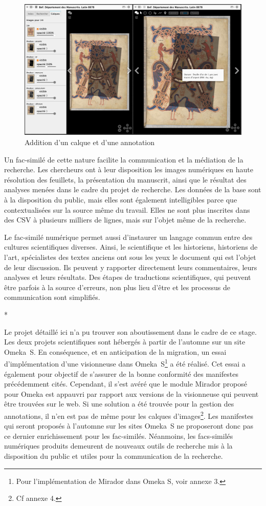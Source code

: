 \begin{figure}[H]
	\centering
	\includegraphics[width=\textwidth]{./textes/chap4/iiif-calque-annot.jpg}
	\caption{Addition d'un calque et d'une annotation}
	\label{fig:info}
\end{figure}
Un fac-similé de cette nature facilite la communication et la médiation de la recherche. Les chercheurs ont à leur disposition les images numériques en haute résolution des feuillets, la présentation du manuscrit, ainsi que le résultat des analyses menées dans le cadre du projet de recherche. Les données de la base sont à la disposition du public, mais elles sont également intelligibles parce que contextualisées sur la source même du travail. Elles ne sont plus inscrites dans des CSV à plusieurs milliers de lignes, mais sur l’objet même de la recherche. \par
Le fac-similé numérique permet aussi d’instaurer un langage commun entre des cultures scientifiques diverses. Ainsi, le scientifique et les historiens, historiens de l’art, spécialistes des textes anciens ont sous les yeux le document qui est l’objet de leur discussion. Ils peuvent y rapporter directement leurs commentaires, leurs analyses et leurs résultats. Des étapes de traductions scientifiques, qui peuvent être parfois à la source d’erreurs, non plus lieu d’être et les processus de communication sont simplifiés.\newpage

*\\\par
Le projet détaillé ici n’a pu trouver son aboutissement dans le cadre de ce stage. Les deux projets scientifiques sont hébergés à partir de l’automne sur un site Omeka~S. En conséquence, et en anticipation de la migration, un essai d’implémentation d’une visionneuse dans Omeka~S\footnote{Pour l’implémentation de Mirador dans Omeka S, voir annexe 3.} a été réalisé. Cet essai a également pour objectif de s’assurer de la bonne conformité des manifestes~ précédemment cités. Cependant, il s’est avéré que le module Mirador proposé pour Omeka est appauvri par rapport aux versions de la visionneuse qui peuvent être trouvées sur le web. Si une solution a été trouvée pour la gestion des annotations, il n’en est pas de même pour les calques d’images\footnote{Cf annexe 4.}. Les manifestes qui seront proposés à l’automne sur les sites Omeka~S ne proposeront donc pas ce dernier enrichissement pour les fac-similés. Néanmoins, les facs-similés numériques produits demeurent de nouveaux outils de recherche mis à la disposition du public et utiles pour la communication de la recherche. 